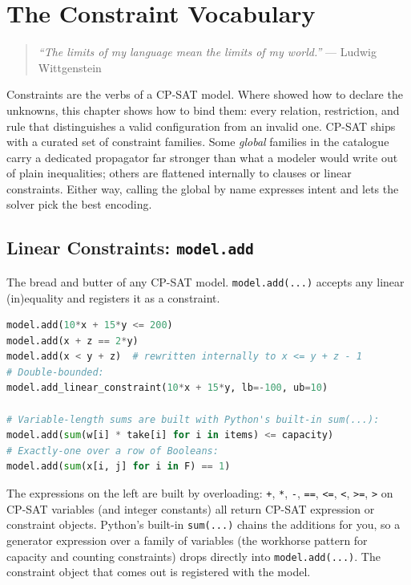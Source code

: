 \chapter{The Constraint Vocabulary}\label{chap:7}

\begin{quote}
\emph{``The limits of my language mean the limits of my world.''} ---
Ludwig Wittgenstein
\end{quote}

Constraints are the verbs of a CP-SAT model. Where  showed how
to declare the unknowns, this chapter shows how to bind them: every
relation, restriction, and rule that distinguishes a valid configuration
from an invalid one. CP-SAT ships with a curated set of constraint
families. Some \emph{global} families in the catalogue carry a dedicated
propagator far stronger than what a modeler would write out of plain
inequalities; others are flattened internally to clauses or linear
constraints. Either way, calling the global by name expresses intent and
lets the solver pick the best encoding.

\section{\texorpdfstring{Linear Constraints: \texttt{model.add}}{Linear Constraints: model.add}}\label{sec:7.1}

The bread and butter of any CP-SAT model.
\lstinline!model.add(...)! accepts any linear (in)equality
and registers it as a constraint.

\begin{lstlisting}[language=Python]
model.add(10*x + 15*y <= 200)
model.add(x + z == 2*y)
model.add(x < y + z)  # rewritten internally to x <= y + z - 1
# Double-bounded:
model.add_linear_constraint(10*x + 15*y, lb=-100, ub=10)

# Variable-length sums are built with Python's built-in sum(...):
model.add(sum(w[i] * take[i] for i in items) <= capacity)
# Exactly-one over a row of Booleans:
model.add(sum(x[i, j] for i in F) == 1)
\end{lstlisting}

The expressions on the left are built by overloading:
\lstinline!+!, \lstinline!*!,
\lstinline!-!, \lstinline!==!,
\lstinline!<=!, \lstinline!<!,
\lstinline!>=!, \lstinline!>! on CP-SAT
variables (and integer constants) all return CP-SAT expression or
constraint objects. Python's built-in \lstinline!sum(...)!
chains the additions for you, so a generator expression over a family of
variables (the workhorse pattern for capacity and counting
constraints) drops directly into
\lstinline!model.add(...)!. The constraint object that
comes out is registered with the model.

